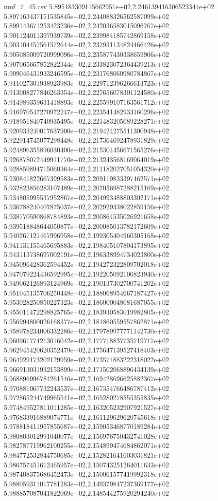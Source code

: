 \begin{filecontents*}{muf_7_45.csv}
5.895183309115662951e+02,2.246139416306523344e+02
5.897163437151535845e+02,2.244088326562587099e+02
5.899143671253423236e+02,2.242036583015096767e+02
5.901124011397939739e+02,2.239984185742869158e+02
5.903104457561572644e+02,2.237931134824466426e+02
5.905085009720999096e+02,2.235877430338659906e+02
5.907065667852822344e+02,2.233823072364439213e+02
5.909046431933246595e+02,2.231768060980784867e+02
5.911027301938923983e+02,2.229712396266613723e+02
5.913008277846263354e+02,2.227656078301124580e+02
5.914989359631418893e+02,2.225599107163561712e+02
5.916970547270972247e+02,2.223541482933160296e+02
5.918951840740935495e+02,2.221483205689228271e+02
5.920933240017637900e+02,2.219424275511300948e+02
5.922914745077298448e+02,2.217364692478931829e+02
5.924896355896030400e+02,2.215304456671565276e+02
5.926878072449911770e+02,2.213243568169064019e+02
5.928859894715060364e+02,2.211182027051054320e+02
5.930841822667399583e+02,2.209119833397462571e+02
5.932823856283107489e+02,2.207056987288215169e+02
5.934805995537952867e+02,2.204993488803302171e+02
5.936788240407875037e+02,2.202929338022859156e+02
5.938770590868784893e+02,2.200864535026921658e+02
5.939518848644050877e+02,2.200085013782172609e+02
5.940267121467996958e+02,2.199305404960305168e+02
5.941131155465695883e+02,2.198405107804173895e+02
5.943113738697002191e+02,2.196338994734023800e+02
5.945096428362594452e+02,2.194272322809702018e+02
5.947079224436592995e+02,2.192205092106823940e+02
5.949062126893124969e+02,2.190137302700741202e+02
5.951045135706250448e+02,2.188068954667187427e+02
5.953028250850227323e+02,2.186000048081687055e+02
5.955011472298825765e+02,2.183930583019982805e+02
5.956994800026168377e+02,2.181860559557862871e+02
5.958978234006332286e+02,2.179789977771142730e+02
5.960961774213016042e+02,2.177718837735719717e+02
5.962945420620352479e+02,2.175647139527418403e+02
5.964929173202129959e+02,2.173574883222318022e+02
5.966913031932153899e+02,2.171502068896434139e+02
5.968896996784261546e+02,2.169428696625882367e+02
5.970881067732243537e+02,2.167354766486787412e+02
5.972865244749965541e+02,2.165280278555355835e+02
5.974849527811011285e+02,2.163205232907921527e+02
5.976833916889074771e+02,2.161129629620745618e+02
5.978818411957855687e+02,2.159053468770189284e+02
5.980803012991040077e+02,2.156976750432741028e+02
5.982787719962100255e+02,2.154899474684862071e+02
5.984772532844750685e+02,2.152821641603031821e+02
5.986757451612465957e+02,2.150743251264011633e+02
5.987408375686452473e+02,2.150061577419992318e+02
5.988059311017781283e+02,2.149379847237369177e+02
5.988857087041822069e+02,2.148544275920294240e+02

\end{filecontents*}
